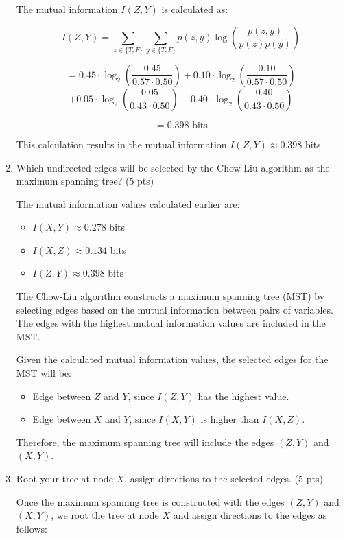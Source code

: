 \documentclass[a4paper]{article}
\theoremstyle{definition}
\newenvironment{soln}{
	\leavevmode\color{blue}\ignorespaces
}{}
\begin{document}
\begin{enumerate}
\begin{soln}
		The mutual information $I(Z, Y)$ is calculated as:

		\[
		I(Z, Y) = \sum_{z \in \{T, F\}} \sum_{y \in \{T, F\}} p(z, y) \log\left(\frac{p(z, y)}{p(z)p(y)}\right)
		\]

		\[
		= 0.45 \cdot \log_2\left(\frac{0.45}{0.57 \cdot 0.50}\right) + 0.10 \cdot \log_2\left(\frac{0.10}{0.57 \cdot 0.50}\right)
		\]
		\[
		+ 0.05 \cdot \log_2\left(\frac{0.05}{0.43 \cdot 0.50}\right) + 0.40 \cdot \log_2\left(\frac{0.40}{0.43 \cdot 0.50}\right)
		\]

		\[
		= 0.398 \text{ bits}
		\]

		This calculation results in the mutual information $I(Z, Y) \approx 0.398$ bits.
	\end{soln}
	\item Which undirected edges will be selected by the Chow-Liu algorithm as the maximum spanning tree? (5 pts)
	\begin{soln}
		The mutual information values calculated earlier are:
		\begin{itemize}
			\item $I(X, Y) \approx 0.278$ bits
			\item $I(X, Z) \approx 0.134$ bits
			\item $I(Z, Y) \approx 0.398$ bits
		\end{itemize}

		The Chow-Liu algorithm constructs a maximum spanning tree (MST) by selecting edges based on the mutual information between pairs of variables. The edges with the highest mutual information values are included in the MST.

		Given the calculated mutual information values, the selected edges for the MST will be:
		\begin{itemize}
			\item Edge between $Z$ and $Y$, since $I(Z, Y)$ has the highest value.
			\item Edge between $X$ and $Y$, since $I(X, Y)$ is higher than $I(X, Z)$.
		\end{itemize}

		Therefore, the maximum spanning tree will include the edges $(Z, Y)$ and $(X, Y)$.
	\end{soln}
	\item Root your tree at node $X$, assign directions to the selected edges. (5 pts)
	\begin{soln}
		Once the maximum spanning tree is constructed with the edges $(Z, Y)$ and $(X, Y)$, we root the tree at node $X$ and assign directions to the edges as follows:


\end{soln}
\end{enumerate}
\end{document}
